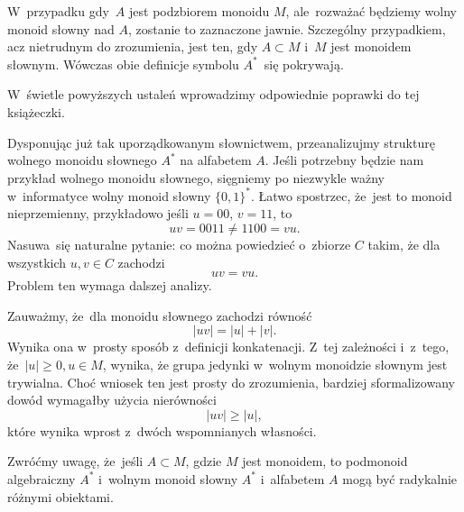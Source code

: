 \documentclass[a4paper,11pt]{article}
\begin{document}
W~przypadku gdy~$A$ jest podzbiorem monoidu $M$, ale~rozważać będziemy
wolny monoid słowny nad $A$, zostanie to zaznaczone jawnie. Szczególny
przypadkiem, acz nietrudnym do zrozumienia, jest ten, gdy $A \subset M$ i~$M$
jest monoidem słownym. Wówczas obie definicje symbolu $A^{ * }$~się
pokrywają.

W~świetle powyższych ustaleń wprowadzimy odpowiednie poprawki do tej
książeczki.

\vspace{\spaceFour}





 Dysponując już tak uporządkowanym słownictwem,
przeanalizujmy strukturę wolnego monoidu słownego $A^{ * }$ na
alfabetem $A$. Jeśli potrzebny będzie nam przykład wolnego monoidu
słownego, sięgniemy po niezwykle ważny w~informatyce wolny monoid
słowny $\{ 0, 1 \}^{ * }$. Łatwo spostrzec, że~jest to monoid
nieprzemienny, przykładowo jeśli $u = 00$, $v = 11$, to
\begin{equation}
  \label{eq:Forys-Forys-08}
  u v = 0011 \neq 1100 = vu.
\end{equation}
Nasuwa~się naturalne pytanie: co można powiedzieć o~zbiorze $C$ takim,
że dla wszystkich $u, v \in C$ zachodzi
\begin{equation}
  \label{eq:Forys-Forys-09}
  uv = vu.
\end{equation}
Problem ten wymaga dalszej analizy.

Zauważmy, że~dla monoidu słownego zachodzi równość
\begin{equation}
  \label{eq:Forys-Forys-10}
  | u v | = | u | + | v |.
\end{equation}
Wynika ona w~prosty sposób z~definicji konkatenacji. Z~tej zależności
i~z~tego, że~$| u | \geq 0, u \in M$, wynika, że grupa jedynki
w~wolnym monoidzie słownym jest trywialna. Choć wniosek ten jest
prosty do zrozumienia, bardziej sformalizowany dowód wymagałby użycia
nierówności
\begin{equation}
  \label{eq:Forys-Forys-11}
  | u v | \geq | u |,
\end{equation}
które wynika wprost z~dwóch wspomnianych własności.

\vspace{\spaceFour}





 Zwróćmy uwagę, że~jeśli $A \subset M$, gdzie $M$ jest
monoidem, to podmonoid algebraiczny $A^{ * }$ i~wolnym monoid słowny
$A^{ * }$ i~alfabetem $A$ mogą być radykalnie różnymi obiektami.
\end{document}
